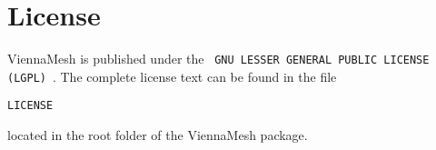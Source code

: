 
\section{License} %

ViennaMesh is published under the 
~\texttt{GNU LESSER GENERAL PUBLIC LICENSE (LGPL)}~\cite{lgpl}. The complete license text can be found 
in the file 

\begin{exaipd}
\begin{Verbatim}
LICENSE
\end{Verbatim}
\end{exaipd}

located in the root folder of the ViennaMesh package.




